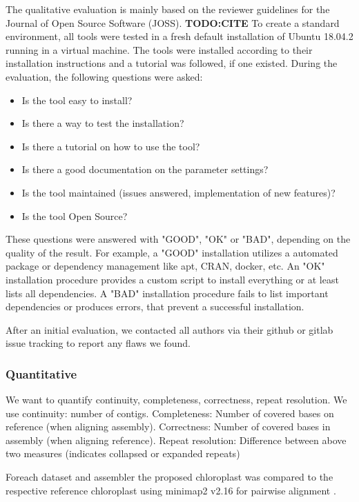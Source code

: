 \documentclass{bmcart}
\begin{document}
The qualitative evaluation is mainly based on the reviewer guidelines for the Journal of Open Source
Software (JOSS). \textbf{TODO:CITE}
To create a standard environment, all tools were tested in a fresh default installation of Ubuntu 18.04.2 running in a virtual machine. The tools were installed according to their installation 
instructions and a tutorial was followed, if one existed. During the evaluation, the following
questions were asked:

\begin{itemize}
    \item Is the tool easy to install? 
    \item Is there a way to test the installation? 
    \item Is there a tutorial on how to use the tool? 
    \item Is there a good documentation on the parameter settings? 
    \item Is the tool maintained (issues answered, implementation of new features)? 
    \item Is the tool Open Source?
\end{itemize}

These questions were answered with "GOOD", "OK" or "BAD", depending on the quality of the result. 
For example, a "GOOD" installation utilizes a automated package or dependency management like apt,
CRAN, docker, etc. An "OK" installation procedure provides a custom script to install everything
or at least lists all dependencies. A "BAD" installation procedure fails to list important dependencies
or produces errors, that prevent a successful installation. 

After an initial evaluation, we contacted all authors via their github or gitlab issue tracking to
report any flaws we found.

\subsubsection*{Quantitative}
We want to quantify continuity, completeness, correctness, repeat resolution.
We use continuity: number of contigs.
Completeness: Number of covered bases on reference (when aligning assembly).
Correctness: Number of covered bases in assembly (when aligning reference).
Repeat resolution: Difference between above two measures (indicates collapsed or expanded repeats)
%

Foreach dataset and assembler the proposed chloroplast was compared to the respective reference chloroplast using minimap2 v2.16 for pairwise alignment \cite{li2018minimap2}.
\end{document}
